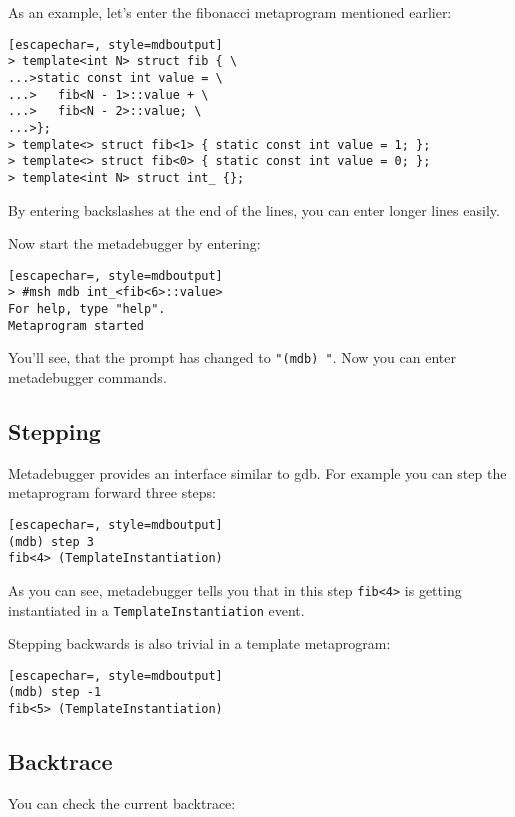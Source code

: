 As an example, let's enter the fibonacci metaprogram mentioned earlier:

\lstset{
    numbers=none
}
\begin{lstlisting}[escapechar=, style=mdboutput]
> template<int N> struct fib { \
...>static const int value = \
...>   fib<N - 1>::value + \
...>   fib<N - 2>::value; \
...>};
> template<> struct fib<1> { static const int value = 1; };
> template<> struct fib<0> { static const int value = 0; };
> template<int N> struct int_ {};
\end{lstlisting}

By entering backslashes at the end of the lines, you can enter longer lines
easily.

Now start the metadebugger by entering:

\begin{lstlisting}[escapechar=, style=mdboutput]
> #msh mdb int_<fib<6>::value>
For help, type "help".
Metaprogram started
\end{lstlisting}

You'll see, that the prompt has changed to \texttt{"(mdb) "}. Now you can enter
metadebugger commands.

\subsection{Stepping}

Metadebugger provides an interface similar to gdb. For example you can step the
metaprogram forward three steps:

\begin{lstlisting}[escapechar=, style=mdboutput]
(mdb) step 3
fib<4> (TemplateInstantiation)
\end{lstlisting}

As you can see, metadebugger tells you that in this step \texttt{fib<4>} is
getting instantiated in a \texttt{TemplateInstantiation} event.

Stepping backwards is also trivial in a template metaprogram:

\begin{lstlisting}[escapechar=, style=mdboutput]
(mdb) step -1
fib<5> (TemplateInstantiation)
\end{lstlisting}

\subsection{Backtrace}

You can check the current backtrace:


